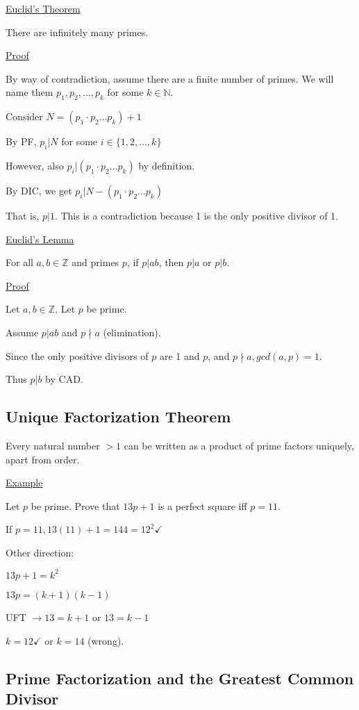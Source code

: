 \documentclass{article}
\begin{document}
\underline{Euclid's Theorem}

There are infinitely many primes.

\underline{Proof}

By way of contradiction, assume there are a finite number of primes. We will name them $p_1, p_2, \ldots, p_k$ for some $k \in \mathbb{N}$.

Consider $N = (p_1 \cdot p_2 \hdots p_k) + 1$

By PF, $p_i \vert N$ for some $i \in \{1,2,\ldots,k\}$

However, also $p_i \vert (p_1 \cdot p_2 \hdots p_k)$ by definition.

By DIC, we get $p_i \vert N - (p_1 \cdot p_2 \hdots p_k)$

That is, $p \vert 1$. This is a contradiction because 1 is the only positive divisor of 1.

\underline{Euclid's Lemma}

For all $a,b \in \mathbb{Z}$ and primes $p$, if $p \vert ab$, then $p \vert a$ or $p \vert b$. 

\underline{Proof}

Let $a,b \in \mathbb{Z}$. Let $p$ be prime. 

Assume $p \vert ab$ and $p \nmid a$ (elimination). 

Since the only positive divisors of $p$ are 1 and $p$, and $p \nmid a, gcd(a,p) =1$.

Thus $p \vert b$ by CAD. 


\subsection{Unique Factorization Theorem}

Every natural number $> 1$ can be written as a product of prime factors uniquely, apart from order.

\underline{Example}

Let $p$ be prime. Prove that $13p + 1$ is a perfect square iff $p = 11$. 

If $p = 11, 13(11) + 1 = 144 = 12^2 \checkmark$

Other direction:

$13p + 1 = k^2$

$13p = (k+1)(k-1)$

UFT $\rightarrow 13 = k+1$ or $13 = k-1$

$k = 12 \checkmark$ or $k = 14$ (wrong). 

\subsection{Prime Factorization and the Greatest Common Divisor}
\end{document}

